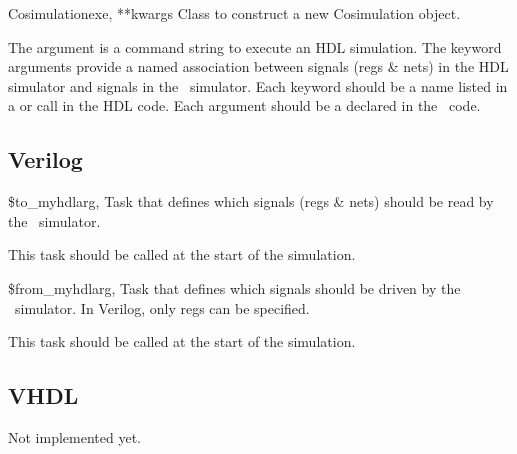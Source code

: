 \begin{classdesc}{Cosimulation}{exe, **kwargs}
Class to construct a new Cosimulation object. 

The  argument is a command string to
execute an HDL simulation. The  keyword
arguments provide a named association between signals
(regs \& nets) in the HDL simulator and signals in the
\myhdl\ simulator. Each keyword should be a name listed
in a  or  call in
the HDL code. Each argument should be a 
declared in the \myhdl\ code.

\end{classdesc}

\subsection{Verilog \label{ref-cosim-verilog}}

\begin{funcdesc}{\$to_myhdl}{arg, }
Task that defines which signals (regs \& nets) should be
read by the \myhdl\ simulator.

This task should be called at the start of the simulation.
\end{funcdesc}

\begin{funcdesc}{\$from_myhdl}{arg, }
Task that defines which signals should be
driven by the \myhdl\ simulator. In Verilog, only regs
can be specified.

This task should be called at the start of the simulation.
\end{funcdesc}


\subsection{VHDL \label{ref-cosim-vhdl}}

Not implemented yet.
